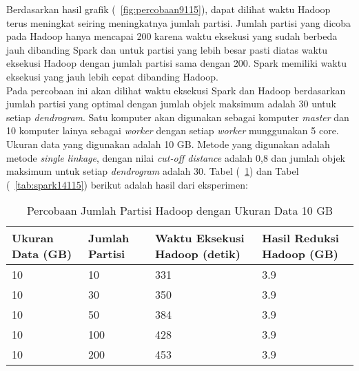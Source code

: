 Berdasarkan hasil grafik (~\ref{fig:percobaan9115}), dapat dilihat waktu Hadoop terus meningkat seiring meningkatnya jumlah partisi. Jumlah partisi yang dicoba pada Hadoop hanya mencapai 200 karena waktu eksekusi yang sudah berbeda jauh dibanding Spark dan untuk partisi yang lebih besar pasti diatas waktu eksekusi Hadoop dengan jumlah partisi sama dengan 200. Spark memiliki waktu eksekusi yang jauh lebih cepat dibanding Hadoop.  \\



Pada percobaan ini akan dilihat waktu eksekusi Spark dan Hadoop berdasarkan jumlah partisi yang optimal dengan jumlah objek maksimum adalah 30 untuk setiap \textit{dendrogram}. Satu komputer akan digunakan sebagai komputer \textit{master} dan 10 komputer lainya sebagai \textit{worker} dengan setiap \textit{worker} munggunakan 5 core. Ukuran data yang digunakan adalah 10 GB. Metode yang digunakan adalah metode \textit{single linkage}, dengan nilai \textit{cut-off distance} adalah 0,8 dan jumlah objek maksimum untuk setiap \textit{dendrogram} adalah 30. Tabel (~\ref{tab:spark13115}) dan Tabel (~\ref{tab:spark14115}) berikut adalah hasil dari eksperimen:





\begin{table}[H] 
	\centering 
	\caption{Percobaan Jumlah Partisi Hadoop dengan Ukuran Data 10 GB}
	\label{tab:spark13115}
	\begin{tabular}{|p{3cm}|p{3cm}|p{4cm}|p{4cm}|}
\hline
Ukuran Data (GB) & Jumlah Partisi &  Waktu Eksekusi Hadoop (detik) & Hasil Reduksi Hadoop (GB)\\
\hline
10 & 10 & 331  & 3.9  \\
\hline
10 & 30 & 350  & 3.9  \\
\hline
10 & 50 & 384  & 3.9   \\
\hline
10 & 100 & 428  & 3.9   \\
\hline
10 & 200 & 453 & 3.9   \\
\hline


\hline

	\end{tabular} 
\end{table}





